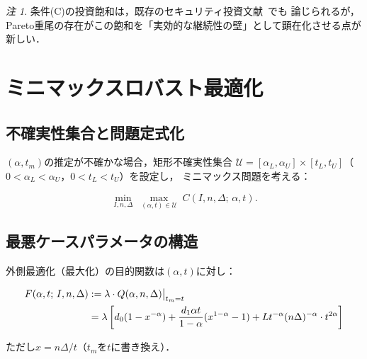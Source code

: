 \documentclass[12pt,a4paper]{article}
\theoremstyle{plain}
\theoremstyle{definition}
\theoremstyle{remark}
\newtheorem{remark}[theorem]{注}
\newcommand{\calU}{\mathcal{U}}
\begin{document}
\begin{remark}
条件(C)の投資飽和は，既存のセキュリティ投資文献~\cite{hausken2006,gordon2002}でも
論じられるが，Pareto重尾の存在がこの飽和を「実効的な継続性の壁」として顕在化させる点が新しい．
\end{remark}

\section{ミニマックスロバスト最適化}
\label{sec:robust}

\subsection{不確実性集合と問題定式化}

$(\alpha,t_m)$の推定が不確かな場合，矩形不確実性集合
$\calU=[\alpha_L,\alpha_U]\times[t_L,t_U]$（$0<\alpha_L<\alpha_U$，$0<t_L<t_U$）を設定し，
ミニマックス問題を考える：

\begin{equation}\label{eq:minimax}
  \min_{I,n,\Delta}\;\max_{(\alpha,t)\in\calU}\;C(I,n,\Delta;\,\alpha,t).
\end{equation}

\subsection{最悪ケースパラメータの構造}

外側最適化（最大化）の目的関数は$(\alpha,t)$に対し：

\begin{align}
  F(\alpha,t;\,I,n,\Delta)
  &:= \lambda\cdot Q(\alpha,n,\Delta)\big|_{t_m=t}\notag\\
  &= \lambda\left[d_0(1-x^{-\alpha})+\frac{d_1\alpha t}{1-\alpha}(x^{1-\alpha}-1)+Lt^{-\alpha}(n\Delta)^{-\alpha}\cdot t^{2\alpha}\right]
  \notag
\end{align}

ただし$x=n\Delta/t$（$t_m$を$t$に書き換え）．
\end{document}
